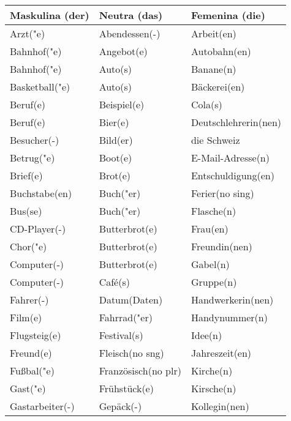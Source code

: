 \documentclass{article}
\renewcommand{\arraystretch}{1}
\begin{document}
\begin{table}[h!]
    \centering
    \label{tab:tabla1}
    \renewcommand{\arraystretch}{1.5}
    \begin{tabular}{|>{\raggedright\arraybackslash}p{5cm}|>{\raggedright\arraybackslash}p{5cm}|>{\raggedright\arraybackslash}p{5cm}|}
        \hline
        \rowcolor{gray!20} \textbf{Maskulina (der)} & \textbf{Neutra (das)} & \textbf{Femenina (die)} \\
        \hline
        Arzt("e) & Abendessen(-) & Arbeit(en) \\\hline
        Bahnhof("e) & Angebot(e) & Autobahn(en) \\\hline
        Bahnhof("e) & Auto(s) & Banane(n) \\\hline
        Basketball("e) & Auto(s) & Bäckerei(en) \\\hline
        Beruf(e) & Beispiel(e) & Cola(s) \\\hline
        Beruf(e) & Bier(e) & Deutschlehrerin(nen) \\\hline
        Besucher(-) & Bild(er) & die Schweiz \\\hline
        Betrug("e) & Boot(e) & E-Mail-Adresse(n) \\\hline
        Brief(e) & Brot(e) & Entschuldigung(en) \\\hline
        Buchstabe(en) & Buch("er) & Ferier(no sing) \\\hline
        Bus(se) & Buch("er) & Flasche(n) \\\hline
        CD-Player(-) & Butterbrot(e) & Frau(en) \\\hline
        Chor("e) & Butterbrot(e) & Freundin(nen) \\\hline
        Computer(-) & Butterbrot(e) & Gabel(n) \\\hline
        Computer(-) & Café(s) & Gruppe(n) \\\hline
        Fahrer(-) & Datum(Daten) & Handwerkerin(nen) \\\hline
        Film(e) & Fahrrad("er) & Handynummer(n) \\\hline
        Flugsteig(e) & Festival(s) & Idee(n) \\\hline
        Freund(e) & Fleisch(no sng) & Jahreszeit(en) \\\hline
        Fu\ss{}bal("e) & Französisch(no plr) & Kirche(n) \\\hline
        Gast("e) & Frühstück(e) & Kirsche(n) \\\hline
        Gastarbeiter(-) & Gepäck(-) & Kollegin(nen) \\\hline

\end{tabular}
\end{table}
\end{document}
